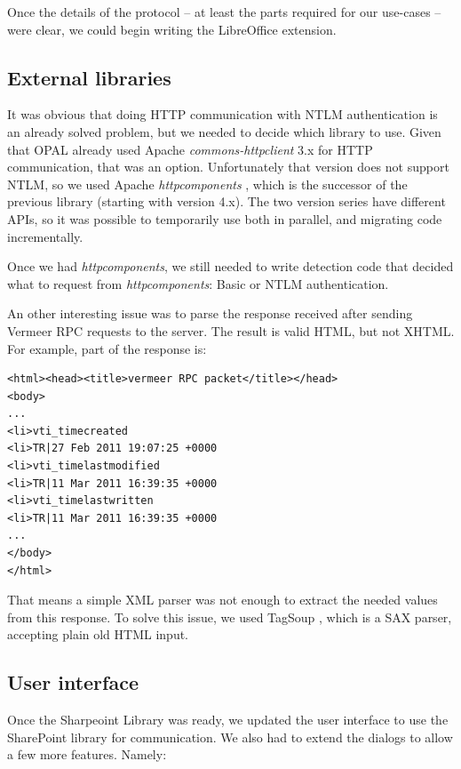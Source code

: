 Once the details of the protocol -- at least the parts required for our use-cases -- were
clear, we could begin writing the LibreOffice extension.

\subsection{External libraries}

It was obvious that doing HTTP communication with NTLM authentication is an
already solved problem, but we needed to decide which library to use. Given that
OPAL already used Apache \emph{commons-httpclient} \cite{httpclient} 3.x for
HTTP communication, that was an option. Unfortunately that version does not support NTLM, so we used
Apache \emph{httpcomponents} \cite{httpcomponents}, which is the successor of
the previous library (starting with version 4.x). The two version series have
different APIs, so it was possible to temporarily use both in parallel, and migrating code
incrementally.

Once we had \emph{httpcomponents}, we still needed to write detection code that
decided what to request from \emph{httpcomponents}: Basic or NTLM
authentication.

An other interesting issue was to parse the response received after sending
Vermeer RPC requests to the server. The result is valid HTML, but not XHTML.
For example, part of the response is:

\begin{lstlisting}
<html><head><title>vermeer RPC packet</title></head>
<body>
...
<li>vti_timecreated
<li>TR|27 Feb 2011 19:07:25 +0000
<li>vti_timelastmodified
<li>TR|11 Mar 2011 16:39:35 +0000
<li>vti_timelastwritten
<li>TR|11 Mar 2011 16:39:35 +0000
...
</body>
</html>\end{lstlisting}

That means a simple XML parser was not enough to extract the needed values from
this response. To solve this issue, we used TagSoup \cite{tagsoup}, which is a
SAX parser, accepting plain old HTML input.

\subsection{User interface}

Once the Sharpeoint Library was ready, we updated the user interface to use the
SharePoint library for communication. We also had to extend the dialogs to allow
a few more features. Namely:

